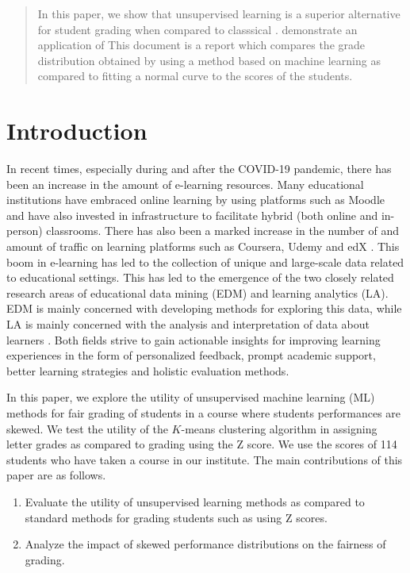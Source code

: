 \documentclass[conference]{IEEEtran}
\begin{document}
\begin{abstract}
	In this paper, we show that unsupervised learning is a superior alternative for student grading when compared to classsical .  demonstrate an application of 
    This document is a report which compares the grade distribution obtained by
    using a method based on machine learning as compared to fitting a normal 
    curve to the scores of the students.
\end{abstract}

\section{Introduction}
\label{sec:intro}
In recent times, especially during and after the COVID-19 pandemic, there has
been an increase in the amount of e-learning resources. Many educational
institutions have embraced online learning by using platforms such as Moodle and
have also invested in infrastructure to facilitate hybrid (both online and
in-person) classrooms. There has also been a marked increase in the number of
and amount of traffic on learning platforms such as Coursera, Udemy and edX
\cite{royEmergingTrendsApplications2017}. This boom in e-learning has led to the
collection of unique and large-scale data related to educational settings. This
has led to the emergence of the two closely related research areas of
educational data mining (EDM) and learning analytics (LA). EDM is mainly
concerned with developing methods for exploring this data, while LA is mainly
concerned with the analysis and interpretation of data about learners
\cite{romeroEducationalDataMining2020}. Both fields strive to gain actionable
insights for improving learning experiences in the form of personalized
feedback, prompt academic support, better learning strategies and holistic
evaluation methods.

In this paper, we explore the utility of unsupervised machine learning (ML)
methods for fair grading of students in a course where students performances are
skewed. We test the utility of the $K$-means clustering algorithm in assigning
letter grades as compared to grading using the Z score. We use the scores of 114
students who have taken a course in our institute. The main contributions of
this paper are as follows.

\begin{enumerate}
    \item Evaluate the utility of unsupervised learning methods as compared to
    standard methods for grading students such as using Z scores.
    \item Analyze the impact of skewed performance distributions on the fairness
    of grading.
\end{enumerate}
\end{document}
